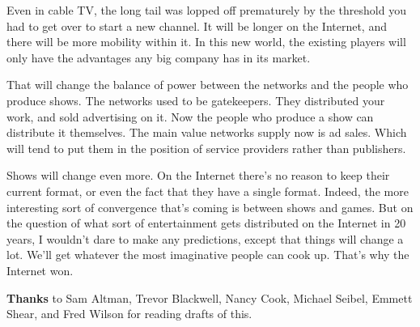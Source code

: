 Even in cable TV, the long tail was lopped off prematurely by the
threshold you had to get over to start a new channel. It will be longer
on the Internet, and there will be more mobility within it. In this new
world, the existing players will only have the advantages any big
company has in its market.

That will change the balance of power between the networks and the
people who produce shows. The networks used to be gatekeepers. They
distributed your work, and sold advertising on it. Now the people who
produce a show can distribute it themselves. The main value networks
supply now is ad sales. Which will tend to put them in the position of
service providers rather than publishers.

Shows will change even more. On the Internet there's no reason to keep
their current format, or even the fact that they have a single format.
Indeed, the more interesting sort of convergence that's coming is
between shows and games. But on the question of what sort of
entertainment gets distributed on the Internet in 20 years, I wouldn't
dare to make any predictions, except that things will change a lot.
We'll get whatever the most imaginative people can cook up. That's why
the Internet won.


\textbf{Thanks} to Sam Altman, Trevor Blackwell, Nancy Cook, Michael
Seibel, Emmett Shear, and Fred Wilson for reading drafts of this.